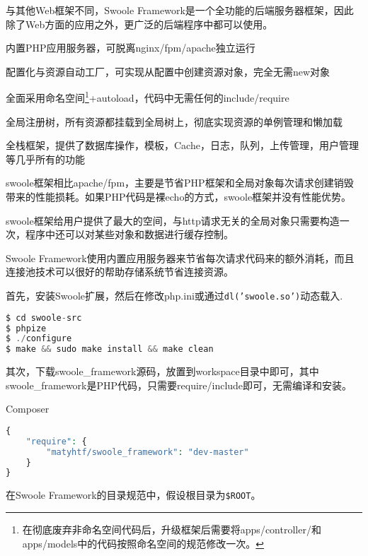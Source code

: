 与其他Web框架不同，Swoole Framework是一个全功能的后端服务器框架，因此除了Web方面的应用之外，更广泛的后端程序中都可以使用。

\begin{compactitem}
\item 内置PHP应用服务器，可脱离nginx/fpm/apache独立运行
\item 配置化与资源自动工厂，可实现从配置中创建资源对象，完全无需new对象
\item 全面采用命名空间\footnote{在彻底废弃非命名空间代码后，升级框架后需要将apps/controller/和apps/models中的代码按照命名空间的规范修改一次。}+autoload，代码中无需任何的include/require
\item 全局注册树，所有资源都挂载到全局树上，彻底实现资源的单例管理和懒加载
\item 全栈框架，提供了数据库操作，模板，Cache，日志，队列，上传管理，用户管理等几乎所有的功能
\end{compactitem}

swoole框架相比apache/fpm，主要是节省PHP框架和全局对象每次请求创建销毁带来的性能损耗。如果PHP代码是裸echo的方式，swoole框架并没有性能优势。

swoole框架给用户提供了最大的空间，与http请求无关的全局对象只需要构造一次，程序中还可以对某些对象和数据进行缓存控制。

Swoole Framework使用内置应用服务器来节省每次请求代码来的额外消耗，而且连接池技术可以很好的帮助存储系统节省连接资源。

首先，安装Swoole扩展，然后在修改php.ini或通过\texttt{dl('swoole.so')}动态载入.


\begin{lstlisting}[language=PHP]
$ cd swoole-src
$ phpize
$ ./configure
$ make && sudo make install && make clean
\end{lstlisting}

其次，下载swoole\_framework源码，放置到workspace目录中即可，其中swoole\_framework是PHP代码，只需要require/include即可，无需编译和安装。

\begin{example}
Composer
\begin{lstlisting}[language=PHP]
{
    "require": {
        "matyhtf/swoole_framework": "dev-master"
    }
}
\end{lstlisting}
\end{example}

在Swoole Framework的目录规范中，假设根目录为\texttt{\$ROOT}。

